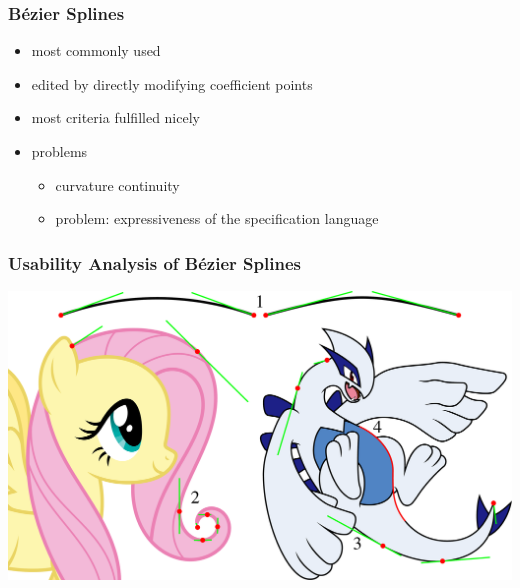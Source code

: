 \documentclass{beamer}
\begin{document}
		\begin{frame}
			\frametitle{Bézier Splines}
			\begin{itemize}
				\item most commonly used
				\item edited by directly modifying coefficient points
				\item most criteria fulfilled nicely
				\item problems
				\begin{itemize}
					\item curvature continuity
					\item problem: expressiveness of the specification language
				\end{itemize}
			\end{itemize}
		\end{frame}
		
		\begin{frame}
			\frametitle{Usability Analysis of Bézier Splines}
			\begin{centering}
				\includegraphics[width=\textwidth]{../resources/usability_bezier.pdf}\\
			\end{centering}
		\end{frame}
		
\end{document}
